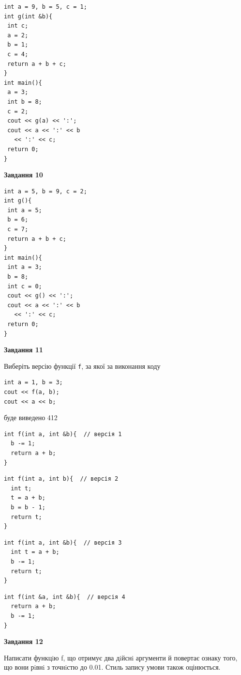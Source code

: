 \documentclass[12pt, ukrainian]{article}
\def\code#1{\Verb!#1!}
\begin{document}
{\begin {large}
\begin{minipage}[t]{7.0cm}
\begin{verbatim}
int a = 9, b = 5, c = 1;
int g(int &b){
 int c;
 a = 2;
 b = 1;
 c = 4;
 return a + b + c;
}
int main(){
 a = 3;
 int b = 8;
 c = 2;
 cout << g(a) << ':';
 cout << a << ':' << b 
   << ':' << c;
 return 0;
}
\end{verbatim}



\begin{center}
\textbf{Завдання 10}
\end{center}
\vspace{-8mm}

\begin{verbatim}
int a = 5, b = 9, c = 2;
int g(){
 int a = 5;
 b = 6;
 c = 7;
 return a + b + c;
}
int main(){
 int a = 3;
 b = 8;
 int c = 0;
 cout << g() << ':';
 cout << a << ':' << b 
   << ':' << c;
 return 0;
}
\end{verbatim}

\end{minipage}
\vline \hspace{1mm}
\begin{minipage}[t]{11.0cm}

\begin{center}
\textbf{Завдання 11}
\end{center}
Виберіть версію функції \code{f}, за якої за виконання коду
\begin{verbatim}
int a = 1, b = 3;
cout << f(a, b);
cout << a << b;
\end{verbatim}

буде виведено 412

\begin{verbatim}
int f(int a, int &b){  // версія 1
  b -= 1;
  return a + b;
}
\end{verbatim}

\vspace{-8mm}\begin{verbatim}
int f(int a, int b){  // версія 2
  int t;
  t = a + b;
  b = b - 1;
  return t;
}
\end{verbatim}

\vspace{-8mm}\begin{verbatim}
int f(int a, int &b){  // версія 3
  int t = a + b;
  b -= 1;
  return t;
}
\end{verbatim}

\vspace{-8mm}\begin{verbatim}
int f(int &a, int &b){  // версія 4
  return a + b;
  b -= 1;
}
\end{verbatim}



\begin{center}
\textbf{Завдання 12}
\end{center}

Написати функцiю f, що отримує два дiйснi аргументи й повертає ознаку того, що вони рiвнi з точнiстю до 0.01. Стиль запису умови також оцінюється.\par

\end{minipage}

\end {large}}
\end{document}
